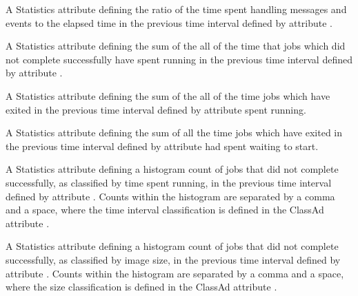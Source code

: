 \begin{description}
\item[\AdAttr{RecentDaemonCoreDutyCycle}:] A Statistics attribute defining
  the ratio of the time spent 
  handling messages and events to the elapsed time 
  in the previous time interval defined by attribute .

\item[\AdAttr{RecentJobsAccumBadputTime}:] A Statistics attribute defining
  the sum of the all of the time that jobs which did not complete successfully 
  have spent running 
  in the previous time interval defined by attribute .


\item[\AdAttr{RecentJobsAccumRunningTime}:] A Statistics attribute defining
  the sum of the all of the time jobs 
  which have exited 
  in the previous time interval defined by attribute 
  spent running.

\item[\AdAttr{RecentJobsAccumTimeToStart}:] A Statistics attribute defining
  the sum of all the time jobs 
  which have exited
  in the previous time interval defined by attribute 
  had spent waiting to start.

\item[\AdAttr{RecentJobsBadputRuntimes}:] A Statistics attribute defining
  a histogram count of jobs that did not complete successfully,
  as classified by time spent running,
  in the previous time interval defined by attribute .
  Counts within the histogram are separated by a comma and a space,
  where the time interval classification is defined in the ClassAd attribute
  .

\item[\AdAttr{RecentJobsBadputSizes}:]  A Statistics attribute defining
  a histogram count of jobs that did not complete successfully,
  as classified by image size,
  in the previous time interval defined by attribute .
  Counts within the histogram are separated by a comma and a space, 
  where the size classification is defined in the ClassAd attribute
  .


\end{description}
